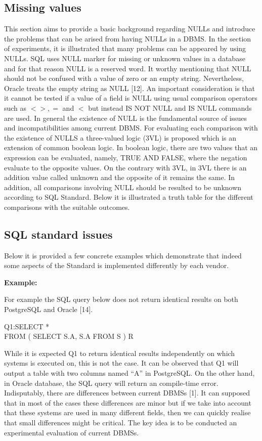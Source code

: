 \subsection{Missing values} 

This section aims to provide a basic background regarding NULLs and introduce the problems that can be arised from having NULLs in a DBMS. In the section of experiments, it is illustrated that many problems can be appeared by using NULLs. SQL uses NULL marker for missing or unknown values in a database and for that reason NULL is a reserved word. It worthy mentioning that NULL should not be confused with a value of zero or an empty string. Nevertheless, Oracle treats the empty string as NULL [12].  An important consideration is that it cannot be tested if a value of a field is NULL using usual comparison operators such as $ <>, = $ and $<$ but instead IS NOT NULL and IS NULL commands are used. In general the existence of NULL is the fundamental source of issues and incompatibilities among current DBMS. For evaluating each comparison with the existence of NULLS a three-valued logic (3VL) is proposed which is an extension of common boolean logic. In boolean logic, there are two values that an expression can be evaluated, namely, TRUE AND FALSE, where the negation evaluate to the opposite values. On the contrary with 3VL, in 3VL there is an addition value called unknown and the opposite of it remains the same. In addition, all comparisons involving NULL should be resulted to be unknown according to SQL Standard. Below it is illustrated a truth table for the different comparisons with the suitable outcomes.    

\subsection{SQL standard issues} 

Below it is provided a few concrete examples which demonstrate that indeed some aspects of the Standard is implemented differently by each vendor. 
 
\noindent\textbf{Example:}

For example the SQL query below does not return identical results on both PostgreSQL and Oracle [14]. 


\begin{mdframed}[backgroundcolor=lightgray!20][h] 
Q1:SELECT * 
 \\FROM ( SELECT S.A, S.A FROM S ) R
\end{mdframed}

While it is expected Q1 to return identical results independently on which systems is executed on, this is not the case. It can be observed that Q1 will output a table with two columns named “A” in PostgreSQL. On the other hand, in Oracle database, the SQL query will return an compile-time error. Ιndisputably, there are differences between current DBMSs [1]. 
It can supposed that in most of the cases these differences are minor but if we take into account that these systems are used in many different fields, then we can quickly realise that small differences might be critical. The key idea is to be conducted an experimental evaluation of current DBMSs. 




